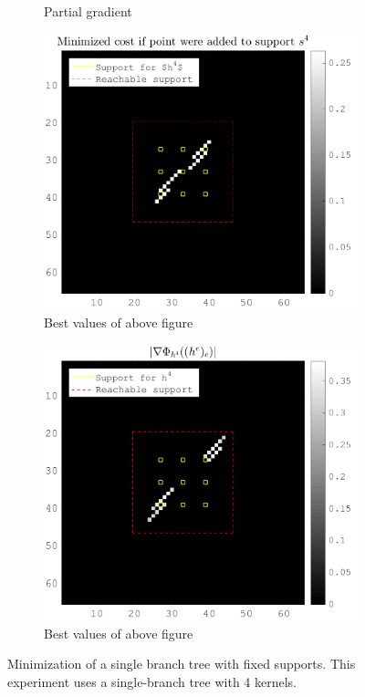 \begin{figure}[!h]
\begin{subfigure}[b]{0.49\textwidth}
\caption{Partial gradient}
\end{subfigure}
\begin{subfigure}[b]{0.49\textwidth}\centering
\includegraphics[width=\textwidth]{figures/xp/xp_128x128_sc2_angl1_K3_S3_node4_objmatrix_bestvalues.png}
\caption{Best values of above figure}
\end{subfigure}
\begin{subfigure}[b]{0.49\textwidth}\centering
\includegraphics[width=\textwidth]{figures/xp/xp_128x128_sc2_angl1_K3_S3_node4_partgrad4_bestvalues.png}
\caption{Best values of above figure}
\end{subfigure}
\caption{Minimization of a single branch tree with fixed supports. This experiment uses a single-branch tree with 4 kernels.}\label{fig_gain_vs_grad}
\end{figure}

